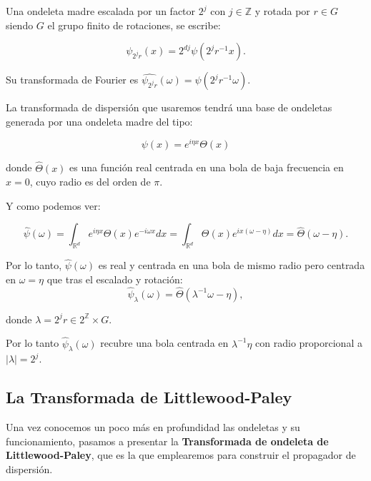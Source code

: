 \begin{definicion}
  Una ondeleta madre escalada por un factor $2^{j}$ con $j \in \mathbb{Z}$ y rotada por $r \in G$ siendo $G$ el grupo finito de rotaciones, se escribe: 

  $$\psi_{2^j r}(x)=2^{dj} \psi(2^j r^{-1} x).$$
\end{definicion}


\medskip

\noindent Su transformada de Fourier es $\widehat{\psi_{2^j r}}(\omega)=\widehat{\psi}(2^j r^{-1} \omega)$.

\medskip

\noindent La transformada de dispersión que usaremos tendrá una base de ondeletas generada por una ondeleta madre del tipo:

$$\psi(x)=e^{i\eta x} \Theta(x)$$

\noindent donde $\widehat{\Theta}(x)$ es una función real centrada en una bola de baja frecuencia en $x=0$, cuyo radio es del orden de $\pi$.

\medskip

\noindent Y como podemos ver:

\begin{equation}
  \widehat{\psi}(\omega)=\int_{\mathbb{R}^d}e^{i \eta x} \Theta(x) e^{-i\omega x} dx=\int_{\mathbb{R}^d}\Theta(x) e^{ix(\omega-\eta)} dx=\widehat{\Theta}(\omega-\eta).
\end{equation}

\medskip

\noindent Por lo tanto, $\widehat{\psi}(\omega)$ es real y centrada en una bola de mismo radio pero centrada en $\omega=\eta$ que tras el escalado y rotación: 
$$\widehat{\psi}_\lambda(\omega)= \widehat{\Theta} (\lambda^{-1}\omega-\eta),$$ 

\noindent donde $\lambda=2^jr \in 2^{\mathbb{Z}}\times G$. 

\noindent Por lo tanto $\widehat{\psi}_\lambda(\omega)$ recubre una bola centrada en $\lambda^{-1}\eta$ con radio proporcional a $|\lambda|=2^j$.
 
\medskip 

\subsection{La Transformada de Littlewood-Paley}

\noindent Una vez conocemos un poco más en profundidad las ondeletas y su funcionamiento, pasamos a presentar la \textbf{Transformada de ondeleta de Littlewood-Paley}, que es la que emplearemos para construir el propagador de dispersión.

